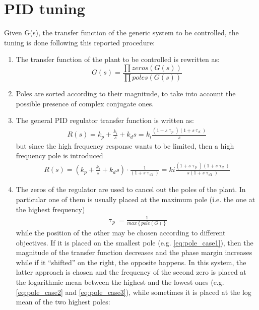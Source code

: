 \newpage
\section{PID tuning}\label{sec:e_pid_tuning}
 Given G(s), the transfer function of the generic system to be controlled, the tuning is done following this reported procedure:
 \begin{enumerate}
    \item The transfer function of the plant to be controlled is rewritten as:
    \begin{equation}
        G(s) = \frac{\prod zeros(G(s))}{\prod poles(G(s))}
    \end{equation}
    \item Poles are sorted according to their magnitude, to take into account the possible presence of complex conjugate ones. 
    \item The general PID regulator transfer function is written as:
    \begin{gather}
         R(s) = k_p+\frac{k_i}{s}+k_ds=k_i\frac{(1+s\uptau_p)(1+s\uptau_d)}{s}
         \label{eq:regulator3}
    \end{gather}
    but since the high frequency response wants to be limited, then a high frequency pole is introduced
    \begin{gather}
         R(s) = \left(k_p+\frac{k_i}{s}+k_ds\right)\cdot \frac{1}{(1+s\uptau_{d1})} = ki\frac{(1+s\uptau_p)(1+s\uptau_d)}{s(1+s\uptau_{d1})}
         \label{eq:regulator4}
    \end{gather}
    \item The zeros of the regulator are used to cancel out the poles of the plant. In particular one of them is usually placed at the maximum pole (i.e. the one at the highest frequency) 
    \begin{gather}
        \uptau_p =\frac{1}{max\left\{pole\left(G\right)\right\}}
    \end{gather}
    while the position of the other may be chosen according to different objectives. If it is placed on the smallest pole (e.g. \autoref{eq:pole_case1}), then the magnitude of the transfer function decreases and the phase margin increases while if it ``shifted'' on the right, the opposite happens. In this system, the latter approach is chosen and the frequency of the second zero is placed at the logarithmic mean between the highest and the lowest ones (e.g. \autoref{eq:pole_case2} and \ref{eq:pole_case3}), while sometimes it is placed at the log mean of the two highest poles:
    \begin{gather}

\end{gather}
\end{enumerate}
